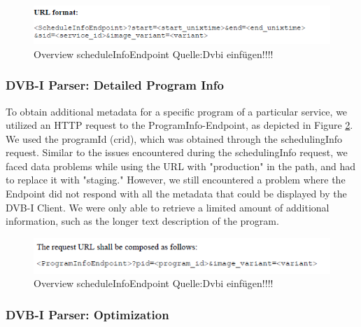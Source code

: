 \documentclass[conference]{IEEEtran}
\begin{document}
\begin{figure}[ht]
	\centerline{\includegraphics[width=\linewidth]{figures/scheduleInfoEndpointTime}}
	\caption{Overview scheduleInfoEndpoint Quelle:Dvbi einfügen!!!!}
	\label{fig:scheduleInfoEndpoint}
\end{figure}



\subsubsection{DVB-I Parser: Detailed Program Info }



To obtain additional metadata for a specific program of a particular service, we utilized an HTTP request to the ProgramInfo-Endpoint, as depicted in Figure \ref{fig:programInfoEndpoint}. We used the programId (crid), which was obtained through the schedulingInfo request. Similar to the issues encountered during the schedulingInfo request, we faced data problems while using the URL with "production" in the path, and had to replace it with "staging." However, we still encountered a problem where the Endpoint did not respond with all the metadata that could be displayed by the DVB-I Client. We were only able to retrieve a limited amount of additional information, such as the longer text description of the program.



\begin{figure}[ht]
	\centerline{\includegraphics[width=\linewidth]{figures/programInfoEndpoint}}
	\caption{Overview scheduleInfoEndpoint Quelle:Dvbi einfügen!!!!}
	\label{fig:programInfoEndpoint}
\end{figure}


\subsubsection{DVB-I Parser: Optimization}
\end{document}

